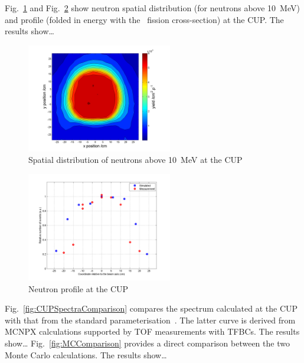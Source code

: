 \documentclass[11pt,a4paper]{IEEEtran}
\let\MYoriglatexcaption\caption
\renewcommand{\caption}[2][\relax]{\MYoriglatexcaption[#2]{#2}}
\def\U238{\BPChem{\^{238}U}}
\begin{document}
Fig.~\ref{fig:CUPDensity} and Fig.~\ref{fig:CUPProfile} show neutron spatial distribution (for neutrons above \SI{10}{\MeV}) and profile (folded in energy with the \U238\ fission cross-section) at the CUP.
The results show\ldots
{}

\begin{figure}[t]
    \centering
    \includegraphics[width=2.5in]{CUP10ColSpatialDistribution10MeV.png}
    \caption{Spatial distribution of neutrons above \SI{10}{\MeV} at the CUP}
    \label{fig:CUPDensity}
\end{figure}

\begin{figure}[t]
    \centering
    \includegraphics[width=2.5in]{CUPTOF10beamproRADECS.png}
    \caption{Neutron profile at the CUP}
    \label{fig:CUPProfile}
\end{figure}

Fig.~\ref{fig:CUPSpectraComparison} compares the spectrum calculated at the CUP with that from the standard parameterisation~\cite{Prokofiev14}.
The latter curve is derived from MCNPX calculations supported by TOF measurements with TFBCs.
The results show\ldots
{}
Fig.~\ref{fig:MCComparison} provides a direct comparison between the two Monte Carlo calculations.
The results show\ldots
{}
\end{document}
